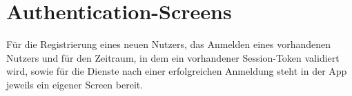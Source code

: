 \section{Authentication-Screens}
\label{clientauthscreens}

Für die Registrierung eines neuen Nutzers, das Anmelden eines vorhandenen Nutzers und für den 
Zeitraum, in dem ein vorhandener Session-Token validiert wird, sowie für die Dienste nach einer
erfolgreichen Anmeldung steht in der App jeweils ein eigener Screen bereit.



